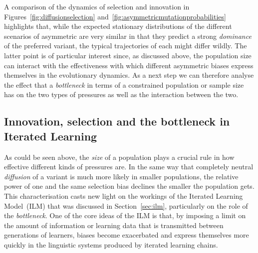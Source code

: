 A comparison of the dynamics of selection and innovation in Figures~\ref{fig:diffusionselection} and~\ref{fig:asymmetricmutationprobabilities} highlights that, while the expected stationary distributions of the different scenarios of asymmetric are very similar in that they predict a strong \emph{dominance} of the preferred variant, the typical trajectories of each might differ wildly.
The latter point is of particular interest since, as discussed above, the population size can interact with the effectiveness with which different asymmetric biases express themselves in the evolutionary dynamics. As a next step we can therefore analyse the effect that a \emph{bottleneck} in terms of a constrained population or sample size has on the two types of pressures as well as the interaction between the two.


\subsection{Innovation, selection and the bottleneck in Iterated Learning}

As could be seen above, the \emph{size} of a population plays a crucial rule in how effective different kinds of pressures are. In the same way that completely neutral \emph{diffusion} of a variant is much more likely in smaller populations, %
the relative power of one and the same selection bias declines the smaller the population gets. This characterisation casts new light on the workings of the Iterated Learning Model~(ILM) that was discussed in Section~\ref{sec:ilm}, particularly on the role of the \emph{bottleneck}.
One of the core ideas of the ILM is that, by imposing a limit on the amount of information or learning data that is transmitted between generations of learners, biases become exacerbated and express themselves more quickly in the linguistic systems produced by iterated learning chains.


